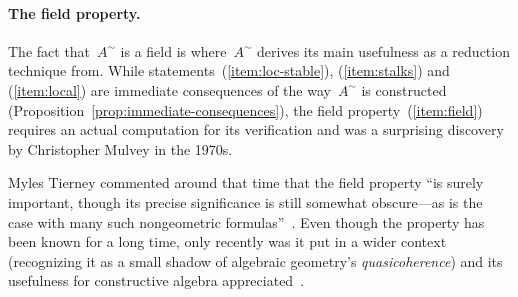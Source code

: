 \documentclass{ws-rv9x6}
\renewcommand{\_}{\mathpunct{.}}
\newcommand{\?}{\,{:}\,}
\begin{document}
\paragraph{The field property.}
The fact that~$A^\sim$ is a field is where~$A^\sim$ derives its main usefulness as a reduction technique
from. While statements~(\ref{item:loc-stable}), (\ref{item:stalks}) and
(\ref{item:local}) are immediate consequences of the way~$A^\sim$ is
constructed (Proposition~\ref{prop:immediate-consequences}), the field property~(\ref{item:field})
requires an actual computation for its verification and was a surprising
discovery by Christopher Mulvey in the 1970s.

Myles Tierney commented around that time that the field property ``is surely important,
though its precise significance is still somewhat obscure---as is the case with
many such nongeometric formulas''~\cite[p.~209]{tierney:spectrum}. Even though
the property has been known for a long time, only recently was it put in a
wider context (recognizing it as a small shadow of algebraic geometry's
\emph{quasicoherence}) and its usefulness for constructive algebra
appreciated~\cite[Sections~3.3 and~11.4]{blechschmidt:phd}.
\end{document}

